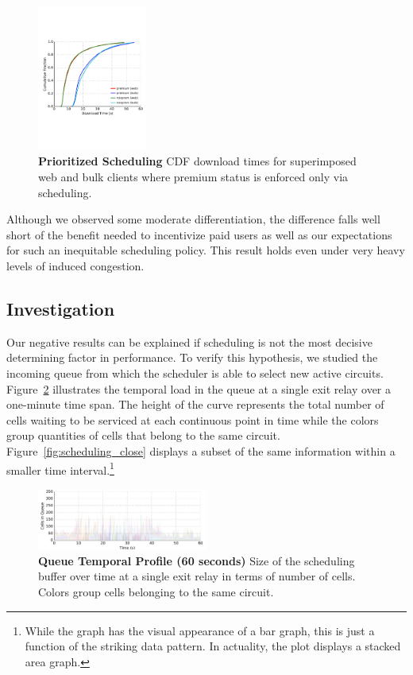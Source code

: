 \begin{figure} \centering
  \includegraphics[trim={0 3cm 0 3cm}, clip, width=0.32\textwidth]{images/scheduling_priority.pdf}
  \caption[Prioritized Scheduling]{\textbf{Prioritized Scheduling} CDF download
    times for superimposed web and bulk clients where premium status is enforced
    only via scheduling.}
  \label{fig:scheduling_priority}
\end{figure}

Although we observed some moderate differentiation, the difference falls well
short of the benefit needed to incentivize paid users as well as our
expectations for such an inequitable scheduling policy. This result holds even
under very heavy levels of induced congestion.

\subsection{Investigation}

Our negative results can be explained if scheduling is not the most decisive
determining factor in performance. To verify this hypothesis, we studied the
incoming queue from which the scheduler is able to select new active
circuits. Figure~\ref{fig:scheduling_far} illustrates the temporal load in the
queue at a single exit relay over a one-minute time span. The height of the
curve represents the total number of cells waiting to be serviced at each
continuous point in time while the colors group quantities of cells that belong
to the same circuit. Figure~\ref{fig:scheduling_close} displays a subset of the
same information within a smaller time interval.\footnote{While the graph has
  the visual appearance of a bar graph, this is just a function of the striking
  data pattern. In actuality, the plot displays a stacked area graph.}


\begin{figure} \centering
  \includegraphics[width=0.5\textwidth]{images/scheduling_far.png}
  \caption[Queue Temporal Profile (60 seconds)]{\textbf{Queue Temporal Profile
      (60 seconds)} Size of the scheduling buffer over time at a single exit
    relay in terms of number of cells. Colors group cells belonging to the same circuit.}
  \label{fig:scheduling_far}
\end{figure}

